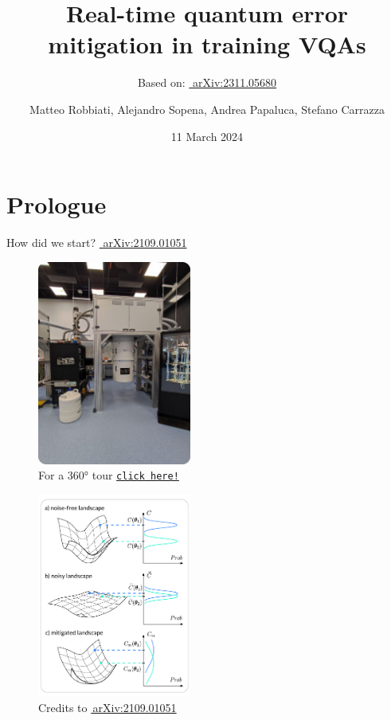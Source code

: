 \documentclass[8pt, xcolor={svgnames}, hyperref={linkcolor=black}]{beamer}
\title{Real-time quantum error mitigation in training VQAs}
\date{11 March 2024}
\author[Matteo Robbiati, Alejandro Sopena, Andrea Papaluca, Stefano Carrazza]{Matteo Robbiati, Alejandro Sopena, Andrea Papaluca, Stefano Carrazza}
\subtitle{Based on: \href{https://arxiv.org/abs/2311.05680}{\faBook\,\,arXiv:2311.05680}}
\begin{document}
\maketitle

\section{Prologue}


\begin{frame}{How did we start? \hfill \href{https://arxiv.org/abs/2109.01051}{\faBook\,\,arXiv:2109.01051}}
\pause
\begin{multicols}{2}
\begin{figure}
\includegraphics[width=0.45\textwidth, height=0.8\textheight]{figures/tii_lab.png}
\caption*{For a 360° tour \href{https://files-prod.tii.ae/360/TII-QRC-Computing-Lab.html}{\texttt{click here!}}}
\end{figure}
\pause
\begin{figure}
\includegraphics[width=0.45\textwidth, height=0.8\textheight]{figures/NIBP_cropped.pdf}
\caption*{Credits to \href{https://arxiv.org/abs/2109.01051}{\faBook\,arXiv:2109.01051}}
\end{figure}
\end{multicols}
\end{frame}
\end{document}
